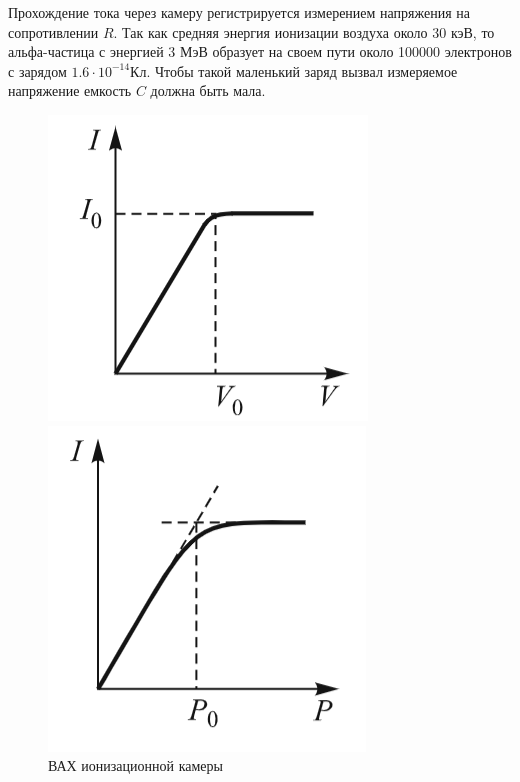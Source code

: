 \documentclass[a4paper]{article}
\begin{document}
Прохождение тока через камеру регистрируется измерением напряжения на сопротивлении $R$. 
Так как средняя энергия ионизации воздуха около 30 кэВ, то альфа-частица с энергией 3 МэВ образует на своем пути 
около 100000 электронов с зарядом $1.6 \cdot 10^{-14}Кл$. Чтобы такой маленький заряд вызвал измеряемое напряжение
емкость $C$ должна быть мала. 

\begin{figure}[h]
    \begin{center}
    \begin{minipage}[h]{0.3\linewidth}
    \includegraphics[width=1\linewidth]{vax.png}
    \caption{ВАХ ионизационной камеры} 
    \label{vax}
    \end{minipage}
    \hfill 
    \begin{minipage}[h]{0.3\linewidth}
    \includegraphics[width=1\linewidth]{iotp.png}

\end{minipage}
\end{center}
\end{figure}
\end{document}
